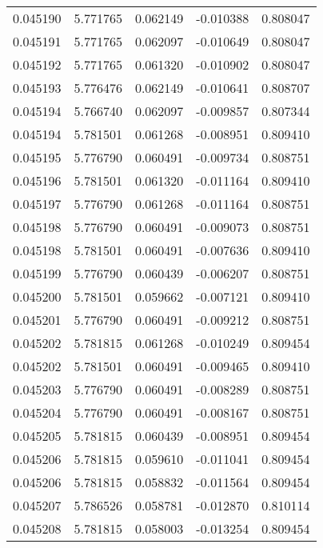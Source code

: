 \begin{tabular}{lrrrr}
0.045190    &  5.771765 &  0.062149 & -0.010388 &             0.808047 \\
0.045191    &  5.771765 &  0.062097 & -0.010649 &             0.808047 \\
0.045192    &  5.771765 &  0.061320 & -0.010902 &             0.808047 \\
0.045193    &  5.776476 &  0.062149 & -0.010641 &             0.808707 \\
0.045194    &  5.766740 &  0.062097 & -0.009857 &             0.807344 \\
0.045194    &  5.781501 &  0.061268 & -0.008951 &             0.809410 \\
0.045195    &  5.776790 &  0.060491 & -0.009734 &             0.808751 \\
0.045196    &  5.781501 &  0.061320 & -0.011164 &             0.809410 \\
0.045197    &  5.776790 &  0.061268 & -0.011164 &             0.808751 \\
0.045198    &  5.776790 &  0.060491 & -0.009073 &             0.808751 \\
0.045198    &  5.781501 &  0.060491 & -0.007636 &             0.809410 \\
0.045199    &  5.776790 &  0.060439 & -0.006207 &             0.808751 \\
0.045200    &  5.781501 &  0.059662 & -0.007121 &             0.809410 \\
0.045201    &  5.776790 &  0.060491 & -0.009212 &             0.808751 \\
0.045202    &  5.781815 &  0.061268 & -0.010249 &             0.809454 \\
0.045202    &  5.781501 &  0.060491 & -0.009465 &             0.809410 \\
0.045203    &  5.776790 &  0.060491 & -0.008289 &             0.808751 \\
0.045204    &  5.776790 &  0.060491 & -0.008167 &             0.808751 \\
0.045205    &  5.781815 &  0.060439 & -0.008951 &             0.809454 \\
0.045206    &  5.781815 &  0.059610 & -0.011041 &             0.809454 \\
0.045206    &  5.781815 &  0.058832 & -0.011564 &             0.809454 \\
0.045207    &  5.786526 &  0.058781 & -0.012870 &             0.810114 \\
0.045208    &  5.781815 &  0.058003 & -0.013254 &             0.809454 \\

\end{tabular}
